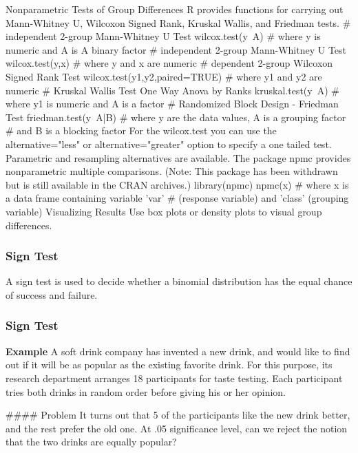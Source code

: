 Nonparametric Tests of Group Differences
R provides functions for carrying out Mann-Whitney U, Wilcoxon Signed Rank, Kruskal Wallis, and Friedman tests.
# independent 2-group Mann-Whitney U Test 
wilcox.test(y~A) 
# where y is numeric and A is A binary factor
# independent 2-group Mann-Whitney U Test
wilcox.test(y,x) # where y and x are numeric
# dependent 2-group Wilcoxon Signed Rank Test 
wilcox.test(y1,y2,paired=TRUE) # where y1 and y2 are numeric
# Kruskal Wallis Test One Way Anova by Ranks 
kruskal.test(y~A) # where y1 is numeric and A is a factor
# Randomized Block Design - Friedman Test 
friedman.test(y~A|B)
# where y are the data values, A is a grouping factor
# and B is a blocking factor
For the wilcox.test you can use the alternative="less" or alternative="greater" option to specify a one tailed test.
Parametric and resampling alternatives are available.
The package npmc provides nonparametric multiple comparisons. (Note: This package has been withdrawn but is still available in the CRAN archives.)
library(npmc)
npmc(x) 
# where x is a data frame containing variable 'var' 
# (response variable) and 'class' (grouping variable)
Visualizing Results
Use box plots or density plots to visual group differences.
\begin{frame}[fragile]
\frametitle{Sign Test}

A sign test is used to decide whether a binomial distribution has the equal chance of success and failure.

\end{frame}
\begin{frame}[fragile]
\frametitle{Sign Test}
\textbf{Example}
A soft drink company has invented a new drink, and would like to find out if it will be as popular as the existing favorite drink. For this purpose, its research department arranges 18 participants for taste testing. Each participant tries both drinks in random order before giving his or her opinion.


\end{frame}
\begin{frame}[fragile]
#### Problem
It turns out that 5 of the participants like the new drink better, and the rest prefer the old one. At .05 significance level, can we reject the notion that the two drinks are equally popular?

\end{frame}
